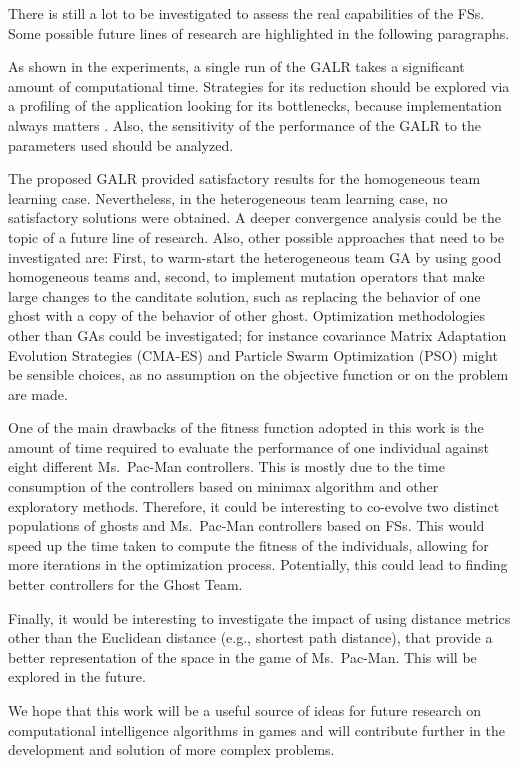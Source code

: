 \documentclass[journal]{IEEEtran}
\begin{document}
There is still a lot to be investigated to assess the real
capabilities of the FSs. Some possible future lines of research are
highlighted in the following paragraphs.

As shown in the experiments, a single run of the GALR takes a
significant amount of computational time. Strategies for its reduction
should be explored via a profiling of the application looking for its
bottlenecks, because implementation always matters
\cite{DBLP:conf/iwann/MereloRACML11}. Also, the sensitivity of the
performance of the GALR to the parameters used should be analyzed. 

The proposed GALR provided satisfactory results for the homogeneous
team learning case. Nevertheless, in the heterogeneous team learning
case, no satisfactory solutions were obtained. A deeper convergence
analysis could be the topic of a future line of research. Also, other
possible approaches that need to be investigated are: First, to
warm-start the heterogeneous team GA by using good homogeneous teams
and, second, to implement mutation operators that make large changes
to the canditate solution, such as replacing the behavior of one ghost
with a copy of the behavior of other ghost. Optimization
methodologies other than GAs could be investigated; for instance
covariance Matrix Adaptation Evolution Strategies (CMA-ES) and
Particle Swarm Optimization (PSO) might be sensible choices, as no
assumption on the objective function or on the problem are made. 

One of the main drawbacks of the fitness function adopted in this work is the amount of time required to evaluate the performance of one individual against eight different Ms.\  Pac-Man controllers. This is mostly due to the time consumption of the controllers based on minimax algorithm and other exploratory methods. Therefore, it could be interesting to co-evolve two distinct populations of ghosts and Ms.\  Pac-Man controllers based on FSs. This would speed up the time taken to compute the fitness of the individuals, allowing for more iterations in the optimization process. Potentially, this could lead to finding better controllers for the Ghost Team.

Finally, it would be interesting to investigate the impact of using distance metrics other than the Euclidean distance (e.g., shortest path distance), that provide a better representation of the space in the game of Ms.\ Pac-Man. This will be explored in the future.

We hope that this work will be a useful source of ideas for future research on computational intelligence algorithms in games and will contribute further in the development and solution of more complex problems.
\end{document}
